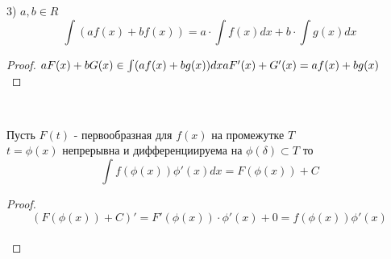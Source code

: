 3) $a, b \in R$\\
\[\int (af(x) + bf(x)) = a \cdot \int f(x)dx + b \cdot \int g(x)dx\]
\begin{proof}
  $aF(x) + bG(x) \in \int (af(x) + bg(x))dx\\
  aF'(x) + G'(x) = af(x) + bg(x)$ \\
\end{proof}

\begin{center}
  \\
\end{center}

\begin{theorem}
  Пусть $F(t)$ - первообразная для $f(x)$ на промежутке $T$ \\
  $t = \phi (x)$ непрерывна и дифференциируема на $\phi(\delta) \subset T$ то\\
  \[\int f(\phi (x)) \phi'(x)dx = F(\phi (x)) + C\]
\end{theorem}

\begin{proof}
  \[(F(\phi(x)) + C)' = F'(\phi (x)) \cdot \phi'(x) + 0 = f(\phi(x))
  \phi'(x)\]\\
\end{proof}